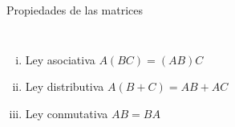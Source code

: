 


\begin{frame}{Propiedades de las matrices}{}
  
  \begin{columns}
      \begin{enumerate}[i)] \justifying \parskip3mm
  \item<only@1,2> \alert{Ley asociativa} $A(BC) = (AB)C$ 
  \item<only@1,3> \alert{Ley distributiva} $A(B + C) = AB + AC$ 
  \item<only@1,4> \alert{Ley conmutativa} $AB = BA$ 
  \end{enumerate}
  \end{columns}
\end{frame}

